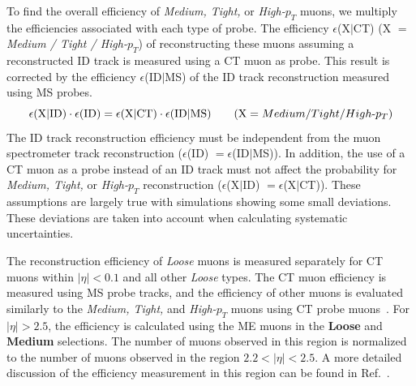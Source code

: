To find the overall efficiency of \textit{Medium, Tight,} or \textit{High-$p_T$} muons, we multiply the efficiencies associated with each type of probe. The efficiency  $\epsilon$(X$|$CT) (X $=$ \textit{Medium / Tight / High-$p_T$}) of reconstructing these muons assuming a reconstructed ID track is measured using a CT muon as probe. This result is corrected by the efficiency $\epsilon$(ID$|$MS) of the ID track reconstruction measured using MS probes.
\begin{equation}
\epsilon \textrm{(X$|$ID)} \cdot \epsilon \textrm{(ID)} = \epsilon \textrm{(X$|$CT)} \cdot \epsilon \textrm{(ID$|$MS)} \hspace{20 pt} (\textrm{X} = Medium/Tight/High\textrm{-}p_T)
\end{equation}
The ID track reconstruction efficiency must be independent from the muon spectrometer track reconstruction ($\epsilon$(ID) $= \epsilon$(ID$|$MS)). In addition, the use of a CT muon as a probe instead of an ID track must not affect the probability for \textit{Medium, Tight,} or \textit{High-$p_T$} reconstruction ($\epsilon$(X$|$ID) $= \epsilon$(X$|$CT)). These assumptions are largely true with simulations showing some small deviations. These deviations are taken into account when calculating systematic uncertainties. 

The reconstruction efficiency of \textit{Loose} muons is measured separately for CT muons within $|\eta| < 0.1$ and all other \textit{Loose} types. The CT muon efficiency is measured using MS probe tracks, and the efficiency of other muons is evaluated similarly to the \textit{Medium, Tight,} and \textit{High-$p_T$} muons using CT probe muons~\cite{MCPpaper}. For $|\eta| > 2.5$, the efficiency is calculated using the ME muons in the \textbf{Loose} and \textbf{Medium} selections. The number of muons observed in this region is normalized to the number of muons observed in the region $2.2 < |\eta| < 2.5$. A more detailed discussion of the efficiency measurement in this region can be found in Ref.~\cite{oldMCPpaper}. 

